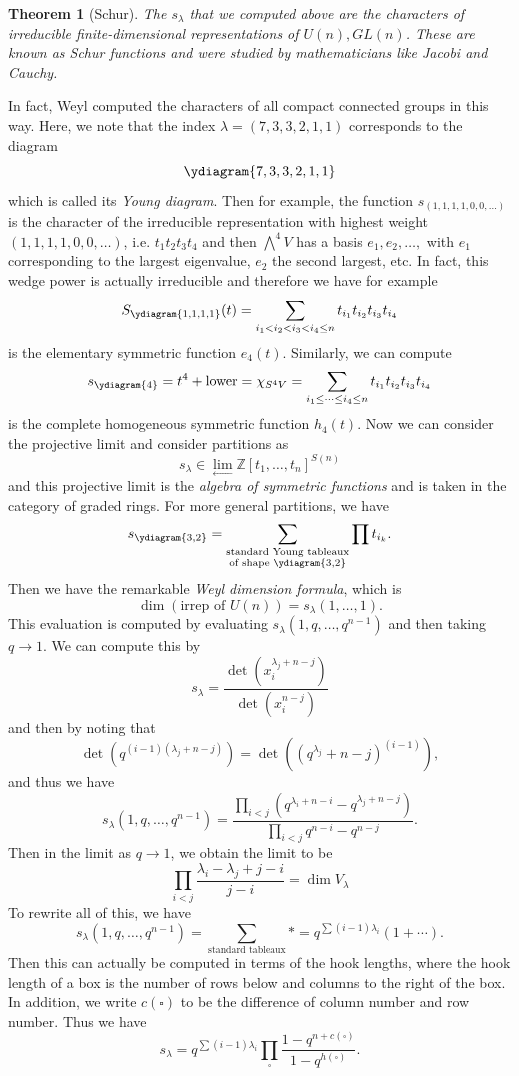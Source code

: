 \documentclass[leqno, openany]{memoir}
\newtheorem{thm}{Theorem}[section]
\theoremstyle{definition}
\theoremstyle{remark}
\theoremstyle{plain}
\theoremstyle{definition}
\theoremstyle{remark}
\newcommand{\Z}{\mathbb{Z}}
\begin{document}
\begin{thm}[Schur]
    The $s_{\lambda}$ that we computed above are the characters of irreducible finite-dimensional representations of $U(n), GL(n)$. These are known as \textit{Schur functions} and were studied by mathematicians like Jacobi and Cauchy. 
\end{thm}

In fact, Weyl computed the characters of all compact connected groups in this way. Here, we note that the index $\lambda = (7, 3, 3, 2, 1, 1)$ corresponds to the diagram
\[ \ydiagram{7,3,3,2,1,1} \]
which is called its \textit{Young diagram}. Then for example, the function $s_{(1,1,1,1,0,0,\ldots)}$ is the character of the irreducible representation with highest weight $(1,1,1,1,0,0,\ldots)$, i.e. $t_1 t_2 t_3 t_4$ and then $\bigwedge^4 V$ has a basis $e_1, e_2, \ldots, $ with $e_1$ corresponding to the largest eigenvalue, $e_2$ the second largest, etc. In fact, this wedge power is actually irreducible and therefore we have for example
\[ S_{\tiny\ydiagram{1,1,1,1}}(t) = \sum_{i_1 < i_2 < i_3 < i_4 \leq n} t_{i_1} t_{i_2} t_{i_3} t_{i_4} \]
is the elementary symmetric function $e_4(t)$. Similarly, we can compute
\[ s_{\tiny\ydiagram{4}} = t^4 + \text{lower} = \chi_{S^4 V} = \sum_{i_1 \leq \cdots \leq i_4 \leq n} t_{i_1} t_{i_2} t_{i_3} t_{i_4} \]
is the complete homogeneous symmetric function $h_4(t)$. Now we can consider the projective limit and consider partitions as
\[ s_{\lambda} \in \lim_{\gets} \Z[t_1, \ldots, t_n]^{S(n)} \]
and this projective limit is the \textit{algebra of symmetric functions} and is taken in the category of graded rings. For more general partitions, we have
\[ s_{\tiny\ydiagram{3,2}} = \sum_{\substack{\text{standard Young tableaux} \\ \text{of shape } \tiny\ydiagram{3,2}}} \prod t_{i_k}. \]
Then we have the remarkable \textit{Weyl dimension formula}, which is
\[ \dim (\text{irrep of $U(n)$}) = s_{\lambda}(1, \ldots, 1). \]
This evaluation is computed by evaluating $s_{\lambda}(1, q, \ldots, q^{n-1})$ and then taking $q \to 1$. We can compute this by
\[ s_{\lambda} = \frac{\det (x_i^{\lambda_j + n - j})}{\det(x_i^{n-j})} \]
and then by noting that
\[ \det (q^{(i-1)(\lambda_j + n - j)}) = \det( (q^{\lambda_j} + n-j)^{(i-1)} ), \]
and thus we have
\[ s_{\lambda}(1, q, \ldots, q^{n-1}) = \frac{\prod_{i<j} (q^{\lambda_i+n-i} - q^{\lambda_j + n-j})}{\prod_{i<j} q^{n-i} - q^{n-j}}. \]
Then in the limit as $q \to 1$, we obtain the limit to be
\[ \prod_{i < j} \frac{\lambda_i - \lambda_j + j - i}{j-i} = \dim V_{\lambda} \]
To rewrite all of this, we have
\[ s_{\lambda}(1, q, \ldots, q^{n-1}) = \sum_{\text{standard tableaux}} * = q^{\sum(i-1)\lambda_i} (1 + \cdots). \]
Then this can actually be computed in terms of the hook lengths, where the hook length of a box is the number of rows below and columns to the right of the box. In addition, we write $c(\square)$ to be the difference of column number and row number. Thus we have
\[ s_{\lambda} = q^{\sum (i-1)\lambda_i} \prod_{\square} \frac{1 - q^{n + c(\square)}}{1 - q^{h(\square)}}. \]
\end{document}
